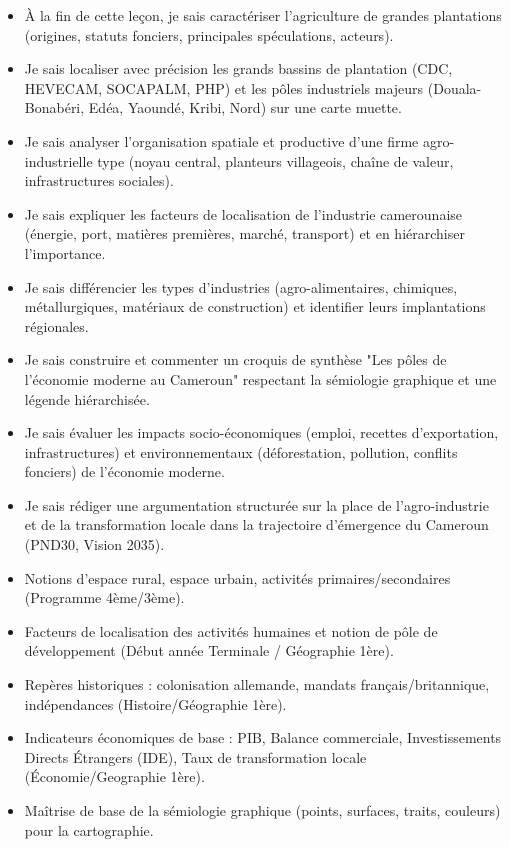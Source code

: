\documentclass[11pt]{article}
\begin{document}
\begin{objectifs}
\begin{itemize}
\item À la fin de cette leçon, je sais caractériser l'agriculture de grandes plantations (origines, statuts fonciers, principales spéculations, acteurs).
\item Je sais localiser avec précision les grands bassins de plantation (CDC, HEVECAM, SOCAPALM, PHP) et les pôles industriels majeurs (Douala-Bonabéri, Edéa, Yaoundé, Kribi, Nord) sur une carte muette.
\item Je sais analyser l'organisation spatiale et productive d'une firme agro-industrielle type (noyau central, planteurs villageois, chaîne de valeur, infrastructures sociales).
\item Je sais expliquer les facteurs de localisation de l'industrie camerounaise (énergie, port, matières premières, marché, transport) et en hiérarchiser l'importance.
\item Je sais différencier les types d'industries (agro-alimentaires, chimiques, métallurgiques, matériaux de construction) et identifier leurs implantations régionales.
\item Je sais construire et commenter un croquis de synthèse "Les pôles de l'économie moderne au Cameroun" respectant la sémiologie graphique et une légende hiérarchisée.
\item Je sais évaluer les impacts socio-économiques (emploi, recettes d'exportation, infrastructures) et environnementaux (déforestation, pollution, conflits fonciers) de l'économie moderne.
\item Je sais rédiger une argumentation structurée sur la place de l'agro-industrie et de la transformation locale dans la trajectoire d'émergence du Cameroun (PND30, Vision 2035).
\end{itemize}
\end{objectifs}

\begin{prerequis}
\begin{itemize}
\item Notions d'espace rural, espace urbain, activités primaires/secondaires (Programme 4ème/3ème).
\item Facteurs de localisation des activités humaines et notion de pôle de développement (Début année Terminale / Géographie 1ère).
\item Repères historiques : colonisation allemande, mandats français/britannique, indépendances (Histoire/Géographie 1ère).
\item Indicateurs économiques de base : PIB, Balance commerciale, Investissements Directs Étrangers (IDE), Taux de transformation locale (Économie/Geographie 1ère).
\item Maîtrise de base de la sémiologie graphique (points, surfaces, traits, couleurs) pour la cartographie.
\end{itemize}
\end{prerequis}
\end{document}

